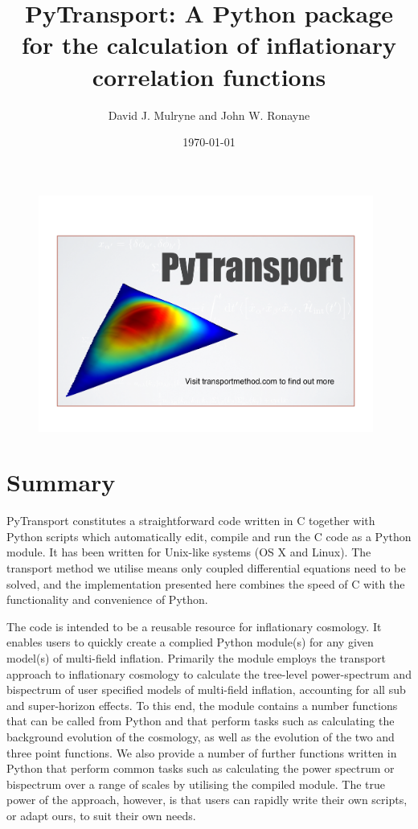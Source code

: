 \documentclass[10pt,
amsmath,amssymb,
aps,prd,nofootinbib,eqsecnum,a4paper]{revtex4}
\newcommand{\CC}{C\nolinebreak\hspace{-.05em}\raisebox{.4ex}{\tiny\bf +}\nolinebreak\hspace{-.10em}\raisebox{.4ex}{\tiny\bf +}}
\def\CC{{C\nolinebreak[4]\hspace{-.05em}\raisebox{.4ex}{\tiny\bf ++}}}
\def\S{ }
\begin{document}
\title{PyTransport: A Python package for the calculation of inflationary correlation functions}
\author{David J. Mulryne and John W. Ronayne}

\date{\today}


\maketitle
\begin{figure}[H]
\centering
\includegraphics[width=11cm]{PyTransLogo}
\end{figure}
\section{Summary}
PyTransport constitutes a straightforward code written in \CC \S  together 
with Python scripts which automatically edit, compile and run the \CC \S code as a 
Python module. It has been written for Unix-like systems (OS X and Linux).
The transport method we utilise means 
only coupled differential equations need to be solved, and the implementation presented here 
combines the speed of \CC \S  with the functionality and convenience of Python. 

The code is intended to be a reusable resource for inflationary cosmology. It enables users to quickly create a 
complied Python module(s) for any given model(s) of multi-field inflation. 
Primarily the module employs the transport approach to inflationary cosmology to calculate 
the tree-level power-spectrum and bispectrum of user specified models of multi-field inflation, 
accounting for all sub and super-horizon effects. To this end,
the module contains a number 
functions that can be called from Python and that perform tasks such as calculating the background evolution 
of the cosmology, as well as the evolution of the two and three point functions. We also provide a number of further functions written in 
Python that perform common tasks such as calculating the power spectrum or bispectrum over a range of scales by utilising the 
compiled module.
The true power of the approach, however, is that users can rapidly write their own scripts, or adapt ours, to suit their own needs. 
\end{document}
